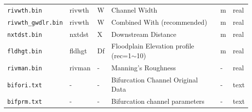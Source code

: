 \begin{table}[]
\begin{tabular}[h]{p{2.5cm}p{1.5cm}p{2.5cm}p{4cm}p{2cm}p{1cm}}
    \texttt{rivwth.bin}        & rivwth   & W                        & Channel Width                           & m       & real    \\
    \texttt{rivwth\_gwdlr.bin} & rivwth   & W                    & Combined With (recommended)    & m       & real    \\
    \texttt{nxtdst.bin}        & nxtdst   & X                             & Downstream Distance                          & m       & real    \\
    \texttt{fldhgt.bin}        & fldhgt   & Df                            & Floodplain Elevation profile (rec=1$\sim$10) & m       & real    \\
    \texttt{rivman.bin}        & rivman   & -                             & Manning’s Roughness                          & -       & real    \\
    \texttt{bifori.txt}        & -        & -                             & Bifurcation Channel Original Data            & -       & text    \\
    \texttt{bifprm.txt}        & -        & -                             & Bifurcation channel parameters               & -       & text    \\ \bottomrule
    \end{tabular}
    \end{table}


